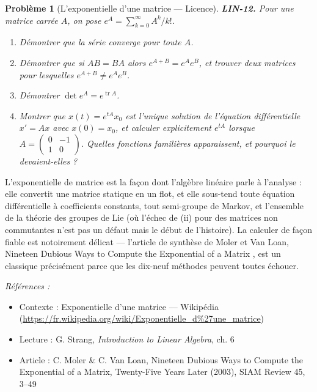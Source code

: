 \documentclass[11pt]{article}
\newtheorem{problem}{Problème}
\newenvironment{refs}{\par\small\noindent\emph{Références :}\begin{itemize}\setlength\itemsep{0pt}}{\end{itemize}\normalsize}
\begin{document}
\bigskip

\begin{problem}[{L'exponentielle d'une matrice --- Licence}]
\textbf{LIN-12.} Pour une matrice carrée $A$, on pose
$e^{A} = \sum_{k=0}^{\infty} A^k / k!$.
\begin{enumerate}
\item[(i)] Démontrer que la série converge pour toute $A$.
\item[(ii)] Démontrer que si $AB = BA$ alors $e^{A+B} = e^A e^B$, et trouver deux matrices pour lesquelles
$e^{A+B} \ne e^A e^B$.
\item[(iii)] Démontrer $\det e^A = e^{\operatorname{tr} A}$.
\item[(iv)] Montrer que
$x(t) = e^{tA} x_0$ est l'unique solution de l'équation différentielle $x' = Ax$ avec
$x(0) = x_0$, et calculer explicitement $e^{tA}$ lorsque $A = \begin{pmatrix} 0 & -1 \\
1 & 0 \end{pmatrix}$. Quelles fonctions familières apparaissent, et pourquoi le devaient-elles ?
\end{enumerate}

\end{problem}

\noindent L'exponentielle de matrice est la façon dont l'algèbre linéaire parle à l'analyse :
elle convertit une matrice statique en un flot, et elle sous-tend toute équation différentielle à
coefficients constants, tout semi-groupe de Markov, et l'ensemble de la théorie des groupes de Lie
(où l'échec de (ii) pour des matrices non commutantes n'est pas un défaut mais le début de
l'histoire). La calculer de façon fiable est notoirement délicat --- l'article de synthèse de Moler et
Van Loan, \og{} Nineteen Dubious Ways to Compute the Exponential of a Matrix \fg{}, est un classique
précisément parce que les dix-neuf méthodes peuvent toutes échouer.

\begin{refs}
\item Contexte : Exponentielle d'une matrice --- Wikipédia (\url{https://fr.wikipedia.org/wiki/Exponentielle_d%27une_matrice})
\item Lecture : G. Strang, \textit{Introduction to Linear Algebra}, ch. 6
\item Article : C. Moler \& C. Van Loan, \og{} Nineteen Dubious Ways to Compute the Exponential of a Matrix, Twenty-Five Years Later \fg{} (2003), SIAM Review 45, 3--49
\end{refs}
\end{document}
